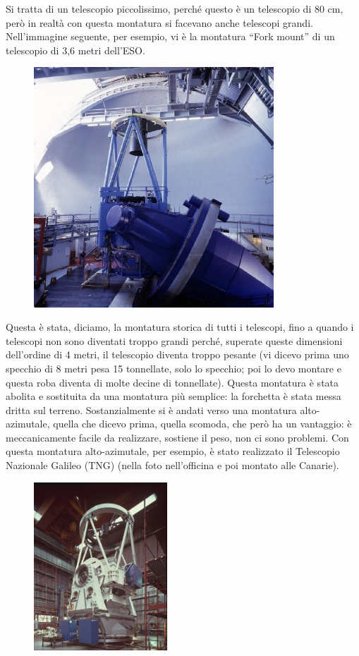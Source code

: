 \documentclass[a4paper,11pt]{article}
\begin{document}
Si tratta di un telescopio piccolissimo, perché questo  è un telescopio di 80 cm, però in realtà con questa montatura si facevano anche telescopi grandi. Nell’immagine seguente, per esempio, vi è la montatura “Fork mount” di un telescopio di 3,6 metri dell’ESO.

\begin{figure}[h!!]
        \centering
        \includegraphics[width=9cm]{10.jpg}
        \label{}
    \end{figure}


Questa è stata, diciamo, la montatura storica di tutti i telescopi, fino a quando i telescopi non sono diventati troppo grandi perché, superate queste dimensioni dell’ordine di 4 metri, il telescopio diventa troppo pesante (vi dicevo prima uno specchio di 8 metri pesa 15 tonnellate, solo lo specchio; poi lo devo montare e questa roba diventa di molte decine di tonnellate). Questa montatura è stata abolita e sostituita da una montatura più semplice: la forchetta è stata messa dritta sul terreno. Sostanzialmente si è andati verso una montatura alto-azimutale, quella che dicevo prima, quella scomoda, che però ha un vantaggio: è meccanicamente facile da realizzare, sostiene il peso, non ci sono problemi. Con questa montatura alto-azimutale, per esempio, è stato realizzato il Telescopio Nazionale Galileo (TNG) (nella foto nell’officina e poi montato alle Canarie).

\begin{figure}[h!!]
        \centering
        \includegraphics[width=5cm]{11.jpg}
        \label{}
    \end{figure}
\end{document}
